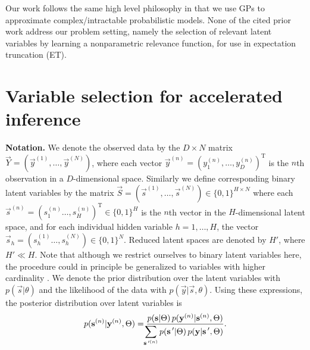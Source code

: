 Our work follows the same high level philosophy in that we use GPs to approximate complex/intractable probabilistic models. None of the cited prior work address our problem setting, namely the selection of relevant latent variables by learning a nonparametric relevance function, for use in expectation truncation (ET).

\section{Variable selection for accelerated inference}
\label{method}
%
\textbf{Notation.}
We denote the observed data by the $D\times N$ matrix $\vec{Y}=(\vec{y}^{(1)}, \dots, \vec{y}^{(N)})$, where each vector $\vec{y}^{(n)} = ( y_1^{(n)}, \dots, y_D^{(n)})^\mathrm{T}$ is the $n$th observation 
in a $D$-dimensional space.
Similarly we define corresponding 
binary latent variables 
by the matrix $\vec{S} = (\vec{s}^{(1)}, \dots, \vec{s}^{(N)})\in \{0,1\}^{H \times N}$ 
where each $\vec{s}^{(n)}=(s_1^{(n)}\dots, s^{(n)}_H)^\mathrm{T} \in \{0,1\}^{H}$ is the $n$th vector in the $H$-dimensional latent space,
and for each individual hidden variable $h=1,\dots,H$, the vector $\vec{s}_h=(s_h^{(1)}\dots, s^{(N)}_h)\in \{0,1\}^{N}$. 
Reduced latent spaces are denoted by $H'$, where $H' \ll H$. 
Note that although we restrict ourselves to binary latent variables here, 
the procedure could in principle be generalized to variables with higher cardinality \citep[e.g. see]{ExarchakisEtAl2012}.
We denote the prior distribution over the latent variables with $p(\vec{s} | \theta)$ 
and the likelihood of the data with $p(\vec{y} | \vec{s}, \theta)$.
Using these expressions, the posterior distribution over latent variables is 
%
\vspace{-.1cm}
\begin{equation}
\label{eq:post}
p({\mathbf{s}}^{(n)}|{\mathbf{y}}^{(n)},\Theta)  = \frac{p({\mathbf{s}} | \Theta) \, p({\mathbf{y}}^{(n)} | {\mathbf{s}}^{(n)}, \Theta)}
{\displaystyle\hspace{-1.5mm}\sum_{{\mathbf{s}}\,'^{(n)}} p({\mathbf{s}}\,' | \Theta) \, p({\mathbf{y}} | {\mathbf{s}}\,', \Theta)}.
\end{equation}
\vspace{-.5cm}

